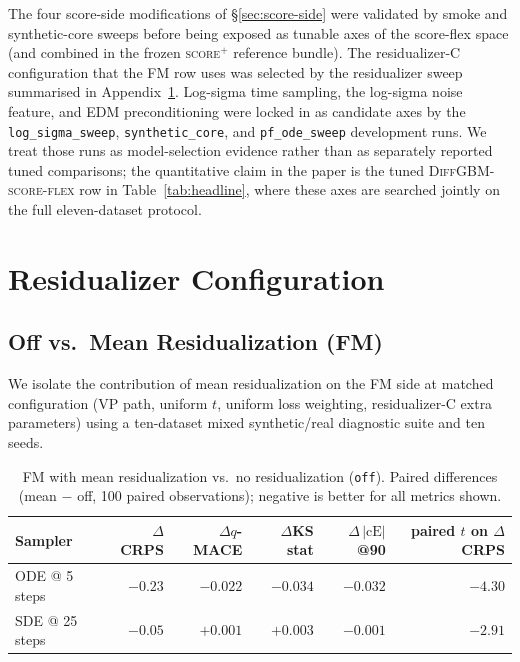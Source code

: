 \documentclass{article}
\begin{document}
The four score-side modifications of \S\ref{sec:score-side} were validated by smoke and synthetic-core sweeps before being exposed as tunable axes of the score-flex space (and combined in the frozen \textsc{score$^+$} reference bundle).
The residualizer-C configuration that the FM row uses was selected by the residualizer sweep summarised in Appendix~\ref{app:resid-config}. Log-sigma time sampling, the log-sigma noise feature, and EDM preconditioning were locked in as candidate axes by the \texttt{log\_sigma\_sweep}, \texttt{synthetic\_core}, and \texttt{pf\_ode\_sweep} development runs. We treat those runs as model-selection evidence rather than as separately reported tuned comparisons; the quantitative claim in the paper is the tuned \textsc{DiffGBM-score-flex} row in Table~\ref{tab:headline}, where these axes are searched jointly on the full eleven-dataset protocol.

\section{Residualizer Configuration}\label{app:resid-config}

\subsection{Off vs.\ Mean Residualization (FM)}\label{app:off-vs-mean}

We isolate the contribution of mean residualization on the FM side at matched configuration (VP path, uniform $t$, uniform loss weighting, residualizer-C extra parameters) using a ten-dataset mixed synthetic/real diagnostic suite and ten seeds.

\begin{table}[!h]
  \centering
  \caption{FM with mean residualization vs.\ no residualization (\texttt{off}). Paired differences (mean $-$ off, 100 paired observations); negative is better for all metrics shown.}\label{tab:off-vs-mean}
  \footnotesize
  \begin{tabular}{lrrrrr}
    \toprule
    Sampler & $\Delta$CRPS & $\Delta q$-MACE & $\Delta$KS stat & $\Delta\,|\text{cE}|$@90 & paired $t$ on $\Delta$CRPS \\
    \midrule
    ODE @ 5 steps  & $-0.23$ & $-0.022$ & $-0.034$ & $-0.032$ & $-4.30$ \\
    SDE @ 25 steps & $-0.05$ & $+0.001$ & $+0.003$ & $-0.001$ & $-2.91$ \\
    \bottomrule
  \end{tabular}
\end{table}
\end{document}
